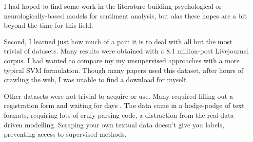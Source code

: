 \documentclass{article}
\begin{document}
I had hoped to find some work in the literature building psychological
or neurologically-based models for sentiment analysis, but alas
these hopes are a bit beyond the time for this field.

Second, I learned just how much of a pain it is to deal with all
but the most trivial of datasets. Many results were obtained with
a 8.1 million-post Livejournal corpus. I had wanted to compare my
my unsupervised approaches with a more typical SVM formulation.
Though many papers used this dataset, after hours of crawling the
web, I was unable to find a download for myself.

Other datasets were not trivial to acquire or use. Many required
filling out a registration form and waiting for days \citep{baccianella10}.
The data came in a hodge-podge of text formats, requiring lots of
crufy parsing code, a distraction from the real data-driven modelling.
Scraping your own textual data doesn't give you labels, preventing
access to supervised methods.
\end{document}
